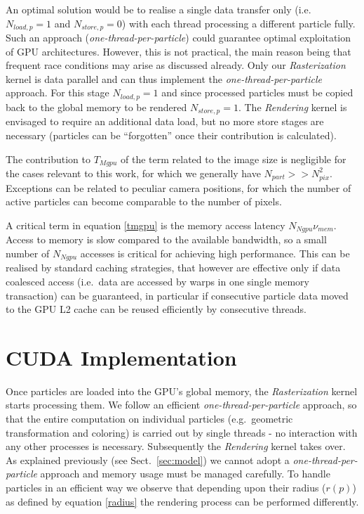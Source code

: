 \documentclass[smallextended]{svjour3}
\begin{document}
An optimal solution would be to realise a single data transfer only
(i.e.\ $N_{load,p} = 1$ and $N_{store,p} = 0$) with each thread processing a different particle fully. Such an approach ({\it one-thread-per-particle}) could guarantee optimal exploitation of GPU architectures. However,
 this is not practical, the main reason being that frequent race conditions may arise as discussed already.
Only our {\it Rasterization} kernel is data parallel and can thus implement the {\it one-thread-per-particle} approach. For this stage $N_{load,p} = 1$ and since processed particles must be copied back to the global memory to be rendered $N_{store,p} = 1$. The {\it Rendering} kernel is envisaged to require an additional data load, but no more store 
stages are necessary (particles can be ``forgotten'' once their contribution is calculated).

The contribution to $T_{Mgpu}$ of the term related to the image size is negligible for the cases relevant to this work, 
for which we generally have $N_{part} >>  N_{pix}^2$. Exceptions can be related to peculiar camera positions, for which the number of 
active particles can become comparable to the number of pixels. 

A critical term in equation \eqref{tmgpu} is the memory access
latency $N_{Ngpu} \nu_{mem}$. Access to memory is slow compared to
the available bandwidth, so a small number of $N_{Ngpu}$ accesses is critical for achieving high performance. This can be realised by standard caching strategies, that
however are effective only if data coalesced access (i.e.\ data are accessed by warps in one single memory transaction) can be guaranteed, in particular if consecutive particle data moved to the GPU L2 cache can be reused efficiently by consecutive threads. 

\section{CUDA Implementation}
\label{sec:implementation}

Once particles are loaded into the GPU's global memory, the {\it Rasterization} kernel starts processing them. We follow an efficient {\it one-thread-per-particle} approach, so that the entire computation on individual particles (e.g.\ geometric transformation and coloring) is carried out by single threads - no interaction with any other processes is necessary. 
Subsequently the {\it Rendering} kernel takes over. As explained previously (see Sect.~\ref{sec:model}) we cannot adopt a {\it one-thread-per-particle} approach and memory usage must be managed carefully. To handle particles in an efficient way we observe that depending upon their radius ($r(p)$) as defined by equation \eqref{radius} the rendering process can be performed differently.
\end{document}

